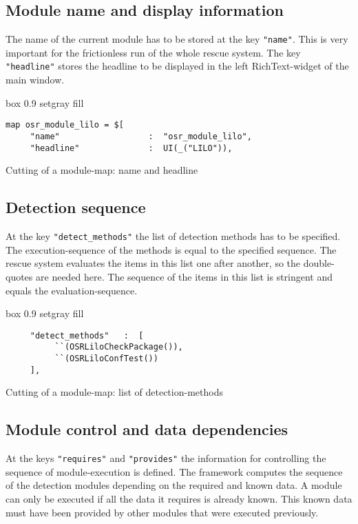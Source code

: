 \subsection{Module name and display information}
The name of the current module has to be stored at the key \verb+"name"+.
This is very important for the frictionless run of the whole rescue system.
The key \verb+"headline"+ stores the headline to be displayed in the left
RichText-widget of the main window.

\begin{program}[h!]
\begin{boxitpara}{box 0.9 setgray fill}
{\footnotesize \begin{verbatim}
map osr_module_lilo = $[
     "name"                  :  "osr_module_lilo",
     "headline"              :  UI(_("LILO")),
\end{verbatim}}%
\end{boxitpara}
\caption{Cutting of a module-map: name and headline}
\end{program}

\subsection{Detection sequence}
At the key \verb+"detect_methods"+ the list of detection methods has to
be specified. The execution-sequence of the methods is equal to the 
specified sequence. The rescue system evaluates the items in this list
one after another, so the double-quotes are needed here. The sequence of
the items in this list is stringent and equals the evaluation-sequence.

\begin{program}[h!]
\begin{boxitpara}{box 0.9 setgray fill}
{\footnotesize \begin{verbatim}
     "detect_methods"   :  [
          ``(OSRLiloCheckPackage()),
          ``(OSRLiloConfTest())
     ],
\end{verbatim}}
\end{boxitpara}
\caption{Cutting of a module-map: list of detection-methods}
\label{detect_methods}
\end{program}

\subsection{Module control and data dependencies}
At the keys \verb+"requires"+ and \verb+"provides"+ the information for
controlling the sequence of module-execution is defined. The framework
computes the sequence of the detection modules depending on the required
and known data. A module can only be executed if all the data it requires
is already known. This known data must have been provided by other modules
that were executed previously.\\

